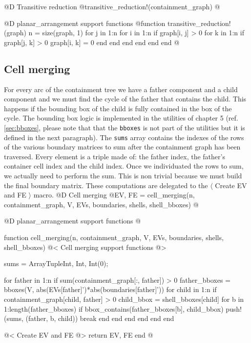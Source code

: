 @D Transitive reduction
@{transitive_reduction!(containment_graph) 
@}

@D planar\_arrangement support functions
@{function transitive_reduction!(graph)
    n = size(graph, 1)
    for j in 1:n
        for i in 1:n
            if graph[i, j] > 0
                for k in 1:n
                    if graph[j, k] > 0
                        graph[i, k] = 0
                    end
                end
            end
        end
    end
end
@}

\subsection{Cell merging}

For every arc of the containment tree we have a father component 
and a child component and we must find the cycle of the father that
contains the child. This happens if the bounding box of the child is fully
contained in the box of the cycle. The bounding box logic is implemented
in the utilities of chapter 5 (ref. \ref{sec:bboxes}, please note that
that the \texttt{bboxes} is not part of the utilities but it is defined 
in the next paragraph). The \texttt{sums} array contains the indexes of 
the rows of the various boundary matrices to sum after the containment 
graph has been traversed. Every element is a triple made of: the father 
index, the father's container cell index and the child index.
Once we individuated the rows to sum, we actually need to perform the sum.
This is non trivial because we must build the final boundary matrix.
These computations are delegated to the $\langle$ Create EV and FE $\rangle$ macro.
@D Cell merging 
@{EV, FE = cell_merging(n, containment_graph, V, EVs, boundaries, shells, shell_bboxes)
@}

@D planar\_arrangement support functions 
@{function cell_merging(n, containment_graph, V, EVs, boundaries, shells, shell_bboxes)
    @< Cell merging support functions @>

    sums = Array{Tuple{Int, Int, Int}}(0);

    for father in 1:n
        if sum(containment_graph[:, father]) > 0
            father_bboxes = bboxes(V, abs(EVs[father]')*abs(boundaries[father]'))
            for child in 1:n
                if containment_graph[child, father] > 0
                    child_bbox = shell_bboxes[child]
                    for b in 1:length(father_bboxes)
                        if bbox_contains(father_bboxes[b], child_bbox)
                            push!(sums, (father, b, child))
                            break
                        end
                    end
                end            
            end
        end
    end

    @< Create EV and FE @>
    return EV, FE
end
@}

